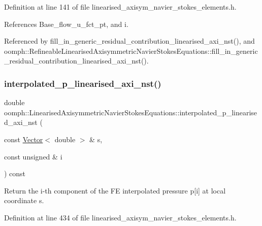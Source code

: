 Definition at line 141 of file linearised\+\_\+axisym\+\_\+navier\+\_\+stokes\+\_\+elements.\+h.



References Base\+\_\+flow\+\_\+u\+\_\+fct\+\_\+pt, and i.



Referenced by fill\+\_\+in\+\_\+generic\+\_\+residual\+\_\+contribution\+\_\+linearised\+\_\+axi\+\_\+nst(), and oomph\+::\+Refineable\+Linearised\+Axisymmetric\+Navier\+Stokes\+Equations\+::fill\+\_\+in\+\_\+generic\+\_\+residual\+\_\+contribution\+\_\+linearised\+\_\+axi\+\_\+nst().

\mbox{\label{classoomph_1_1LinearisedAxisymmetricNavierStokesEquations_ab76ddaeff2316c47442bb31278012d56}} 
\subsubsection{\texorpdfstring{interpolated\+\_\+p\+\_\+linearised\+\_\+axi\+\_\+nst()}{interpolated\_p\_linearised\_axi\_nst()}}
{\footnotesize\ttfamily double oomph\+::\+Linearised\+Axisymmetric\+Navier\+Stokes\+Equations\+::interpolated\+\_\+p\+\_\+linearised\+\_\+axi\+\_\+nst (\begin{DoxyParamCaption}\item[{const \hyperlink{classoomph_1_1Vector}{Vector}$<$ double $>$ \&}]{s,  }\item[{const unsigned \&}]{i }\end{DoxyParamCaption}) const\hspace{0.3cm}{\ttfamily [inline]}}



Return the i-\/th component of the FE interpolated pressure p\mbox{[}i\mbox{]} at local coordinate s. 



Definition at line 434 of file linearised\+\_\+axisym\+\_\+navier\+\_\+stokes\+\_\+elements.\+h.



